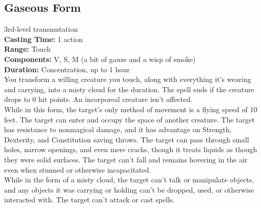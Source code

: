 \documentclass[11pt, A4paper, english]{article}
\begin{document}
		\subsection{Gaseous Form}
3rd-level transmutation \\
\textbf{Casting Time:} 1 action \\
\textbf{Range:} Touch \\
\textbf{Components:} V, S, M (a bit of gauze and a wisp of smoke) \\
\textbf{Duration:} Concentration, up to 1 hour \\
You transform a willing creature you touch, along with everything it's wearing and carrying, into a misty cloud for the duration. The spell ends if the creature drops to 0 hit points. An incorporeal creature isn't affected. \\
While in this form, the target's only method of movement is a flying speed of 10 feet. The target can enter and occupy the space of another creature. The target has resistance to nonmagical damage, and it has advantage on Strength, Dexterity, and Constitution saving throws. The target can pass through small holes, narrow openings, and even mere cracks, though it treats liquids as though they were solid surfaces. The target can't fall and remains hovering in the air even when stunned or otherwise incapacitated. \\
While in the form of a misty cloud, the target can't talk or manipulate objects, and any objects it was carrying or holding can't be dropped, used, or otherwise interacted with. The target can't attack or cast spells.
\end{document}
